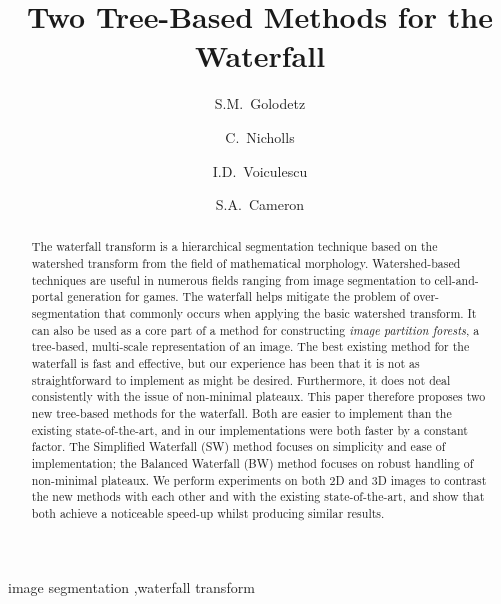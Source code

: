 \documentclass[preprint,a4paper]{elsarticle}
\begin{document}
\begin{frontmatter}

\title{Two Tree-Based Methods for the Waterfall}

\author[ox]{S.M.~Golodetz}

\author[ox]{C.~Nicholls}

\author[ox]{I.D.~Voiculescu}

\author[ox]{S.A.~Cameron}


\address[ox]{Department of Computer Science, University of Oxford, Wolfson Building, Parks Road, Oxford, OX1 3QD, United Kingdom}

\begin{abstract}
The waterfall transform is a hierarchical segmentation technique based on the watershed transform from the field of mathematical morphology. Watershed-based techniques are useful in numerous fields ranging from image segmentation to cell-and-portal generation for games. The waterfall helps mitigate the problem of over-segmentation that commonly occurs when applying the basic watershed transform. It can also be used as a core part of a method for constructing \emph{image partition forests}, a tree-based, multi-scale representation of an image. The best existing method for the waterfall is fast and effective, but our experience has been that it is not as straightforward to implement as might be desired. Furthermore, it does not deal consistently with the issue of non-minimal plateaux. This paper therefore proposes two new tree-based methods for the waterfall. Both are easier to implement than the existing state-of-the-art, and in our implementations were both faster by a constant factor. The Simplified Waterfall (SW) method focuses on simplicity and ease of implementation; the Balanced Waterfall (BW) method focuses on robust handling of non-minimal plateaux. We perform experiments on both 2D and 3D images to contrast the new methods with each other and with the existing state-of-the-art, and show that both achieve a noticeable speed-up whilst producing similar results.
\end{abstract}

\begin{keyword}
image segmentation \sep waterfall transform
\end{keyword}

\end{frontmatter}
\end{document}
